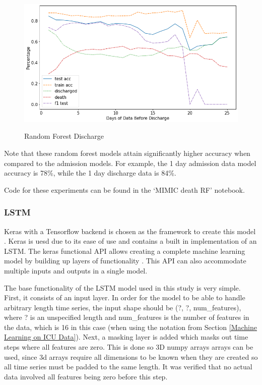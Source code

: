 \documentclass[12pt]{article}
\begin{document}
\begin{figure}[H]
\centering\caption{Random Forest Discharge}
\includegraphics[scale=0.52]{Random Forest Discharge.png}
\label{Random Forest Discharge}
\end{figure}
Note that these random forest models attain significantly higher accuracy when compared to the admission models. For example, the 1 day admission data model accuracy is 78\%, while the 1 day discharge data is 84\%.

Code for these experiments can be found in the `MIMIC death RF' notebook. 

\subsubsection{LSTM}
\label{LSTM}
Keras with a Tensorflow backend is chosen as the framework to create this model \cite{keras}. Keras is uesd due to its ease of use and contains a built in implementation of an LSTM. The keras functional API allows creating a complete machine learning model by building up layers of functionality \cite{keras}. This API can also accommodate multiple inputs and outputs in a single model. 

The base functionality of the LSTM model used in this study is very simple. First, it consists of an input layer. In order for the model to be able to handle arbitrary length time series, the input shape should be (?, ?, num\_features), where ? is an unspecified length and num\_features is the number of features in the data, which is 16 in this case (when using the notation from Section \ref{Machine Learning on ICU Data}). Next, a masking layer is added which masks out time steps where all features are zero. This is done so 3D numpy arrays arrays can be used, since 3d arrays require all dimensions to be known when they are created so all time series must be padded to the same length. It was verified that no actual data involved all features being zero before this step.
\end{document}

